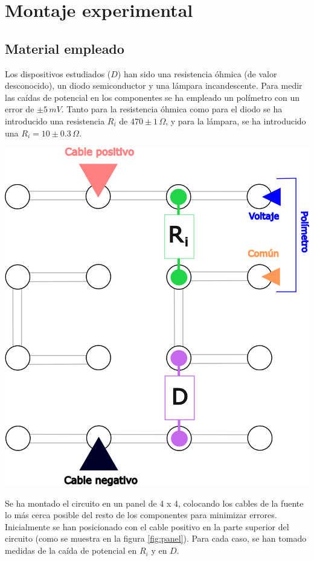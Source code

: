 \documentclass[fleqn,usenatbib,openbib]{mnras}
\begin{document}
\section{Montaje experimental}

\subsection{Material empleado}

Los dispositivos estudiados ($D$) han sido una resistencia óhmica (de valor desconocido), un diodo semiconductor y una lámpara incandescente. Para medir las caídas de potencial en los componentes se ha empleado un polímetro con un error de $\pm 5\, mV$. Tanto para la resistencia óhmica como para el diodo se ha introducido una resistencia $R_i$ de $470 \pm 1 \,\Omega$, y para la lámpara, se ha introducido una $R_i = 10\pm  0.3\,\Omega$. 

\begin{minipage}{0.5\columnwidth}
    \centering
    \includegraphics[width=0.8\columnwidth]{images/panel.png}
    \label{fig:panel}
\end{minipage}
\begin{minipage}{0.4\columnwidth}
    Se ha montado el circuito en un panel de 4 x 4, colocando los cables de la fuente lo más cerca posible del resto de los componentes para minimizar errores. Inicialmente se han posicionado con el cable positivo en la parte superior del circuito (como se muestra en la figura \ref{fig:panel}). Para cada caso, se han tomado medidas de la caída de potencial en $R_i$ y en $D$.
\end{minipage}
\end{document}
